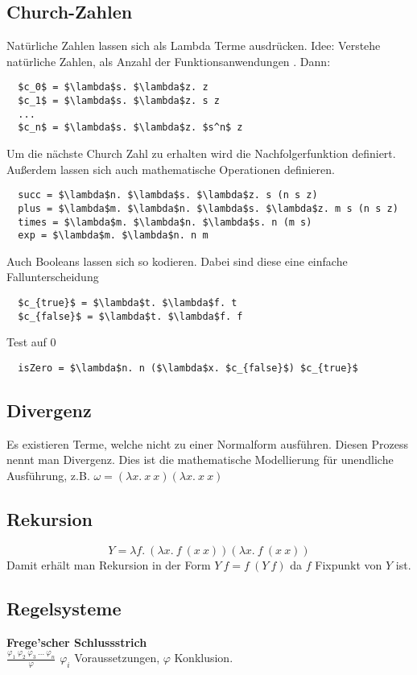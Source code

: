 \subsection{Church-Zahlen}%
\label{tg:sub:church-zahlen}
Natürliche Zahlen lassen sich als Lambda Terme ausdrücken.
Idee: Verstehe natürliche Zahlen, als Anzahl der Funktionsanwendungen . Dann:
\begin{lstlisting}
  $c_0$ = $\lambda$s. $\lambda$z. z
  $c_1$ = $\lambda$s. $\lambda$z. s z
  ...
  $c_n$ = $\lambda$s. $\lambda$z. $s^n$ z

\end{lstlisting}
Um die nächste Church Zahl zu erhalten wird die Nachfolgerfunktion  definiert.
Außerdem lassen sich auch mathematische Operationen definieren.
\begin{lstlisting}
  succ = $\lambda$n. $\lambda$s. $\lambda$z. s (n s z)
  plus = $\lambda$m. $\lambda$n. $\lambda$s. $\lambda$z. m s (n s z)
  times = $\lambda$m. $\lambda$n. $\lambda$s. n (m s)
  exp = $\lambda$m. $\lambda$n. n m
\end{lstlisting}
Auch Booleans lassen sich so kodieren. Dabei sind diese eine einfache Fallunterscheidung
\begin{lstlisting}
  $c_{true}$ = $\lambda$t. $\lambda$f. t
  $c_{false}$ = $\lambda$t. $\lambda$f. f
\end{lstlisting}
Test auf 0
\begin{lstlisting}
  isZero = $\lambda$n. n ($\lambda$x. $c_{false}$) $c_{true}$
\end{lstlisting}

\subsection{Divergenz}%
\label{tg:sub:divergenz}
Es existieren Terme, welche nicht zu einer Normalform ausführen. Diesen Prozess nennt man Divergenz.
Dies ist die mathematische Modellierung für unendliche Ausführung, z.B.
\(\omega = (\lambda x.\ x\ x)(\lambda x.\ x\ x)\)

\subsection{Rekursion}%
\label{tg:sub:rekursion}
\[Y = \lambda f.\ (\lambda x.\ f\ (x\ x))(\lambda x.\ f\ (x\ x))\]
Damit erhält man Rekursion in der Form \(Y\ f = f\ (Y\ f)\) da \(f\) Fixpunkt von \(Y\) ist.


\subsection{Regelsysteme}%
\label{tg:sub:regelsysteme}
\textbf{Frege'scher Schlussstrich}\\
\(\frac{\varphi_1\ \varphi_2\ \varphi_3\ \ldots\ \varphi_n}{\varphi}\) \(\varphi_i\) Voraussetzungen, \(\varphi\) Konklusion.\\

